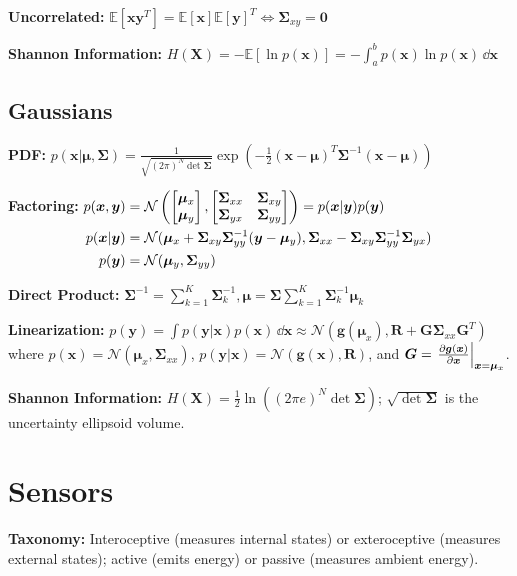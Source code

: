 \documentclass[twocolumn, 8pt]{extarticle}
\begin{document}
\textbf{Uncorrelated:} \(\mathbb E[\bm x\bm y^T] = \mathbb E[\bm x]\mathbb E[\bm y]^T \iff \bm\Sigma _{xy} = \bm 0\)

\textbf{Shannon Information:} $\displaystyle H(\bm X) = -\mathbb E[\ln p(\bm x)] = -\int _a^b p(\bm x)\ln p(\bm x)\,\dd\bm x$

\subsection{Gaussians}

\textbf{PDF:} \(\displaystyle p(\bm x | \bm\mu, \bm\Sigma) = \frac{1}{\sqrt{(2\pi)^N\det\bm\Sigma}}\exp\left(-\frac{1}{2}(\bm x - \bm\mu)^T\bm\Sigma^{-1}(\bm x - \bm\mu)\right)\)

\textbf{Factoring:}
\(\begin{aligned}[t]
  p(\bm x, \bm y) & = \mathcal N\left(\cvec{\bm\mu _x}{\bm\mu _y}, \mattwo{\bm\Sigma _{xx}}{\bm\Sigma _{xy}}{\bm\Sigma _{yx}}{\bm\Sigma _{yy}}\right) = p(\bm x | \bm y)p(\bm y) \\
	p(\bm x | \bm y) & = \mathcal N(\bm\mu _x + \bm\Sigma _{xy}\bm\Sigma^{-1}_{yy}(\bm y - \bm\mu _y), \bm\Sigma _{xx} - \bm\Sigma _{xy}\bm\Sigma _{yy}^{-1}\bm\Sigma _{yx}) \\
	p(\bm y) & = \mathcal N(\bm\mu _y, \bm\Sigma _{yy})
\end{aligned}\)

\textbf{Direct Product:} \(\displaystyle \bm\Sigma^{-1} = \sum _{k = 1}^K\bm\Sigma _k^{-1}, \bm\mu = \bm\Sigma\sum _{k = 1}^K\bm\Sigma _k^{-1}\bm\mu _k\)

\textbf{Linearization:} \(\displaystyle p(\bm y) = \int p(\bm y | \bm x)p(\bm x)\,\dd\bm x \approx \mathcal N(\bm g(\bm\mu _x), \bm R + \bm G\bm\Sigma _{xx}\bm G^T)\)
where $p(\bm x) = \mathcal N(\bm\mu _x, \bm\Sigma _{xx})$, $p(\bm y | \bm x) = \mathcal N(\bm g(\bm x), \bm R)$, and $\bm G = \left.\frac{\partial\bm g(\bm x)}{\partial\bm x}\right\rvert_{\bm x = \bm\mu _x}$.

\textbf{Shannon Information:} \(H(\bm X) = \frac{1}{2}\ln((2\pi e)^N\det\bm\Sigma)\); \(\sqrt{\det\bm\Sigma}\) is the uncertainty ellipsoid volume.

\section{Sensors} %

\textbf{Taxonomy:} Interoceptive (measures internal states) or exteroceptive (measures external states); active (emits
energy) or passive (measures ambient energy).
\end{document}
